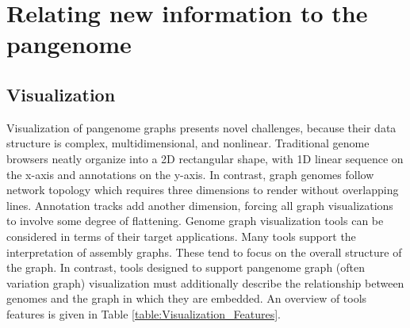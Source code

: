 \section{Relating new information to the pangenome}

\subsection{Visualization}


Visualization of pangenome graphs presents novel challenges, because their data structure is complex, multidimensional, and nonlinear.
Traditional genome browsers neatly organize into a 2D rectangular shape, with 1D linear sequence on the x-axis and annotations on the y-axis.
In contrast, graph genomes follow network topology which requires three dimensions to render without overlapping lines.
Annotation tracks add another dimension, forcing all graph visualizations to involve some degree of flattening.  
Genome graph visualization tools can be considered in terms of their target applications. 
Many tools support the interpretation of assembly graphs. 
These tend to focus on the overall structure of the graph. 
In contrast, tools designed to support pangenome graph (often variation graph) visualization must additionally describe the relationship between genomes and the graph in which they are embedded.
An overview of tools features is given in Table \ref{table:Visualization_Features}.

